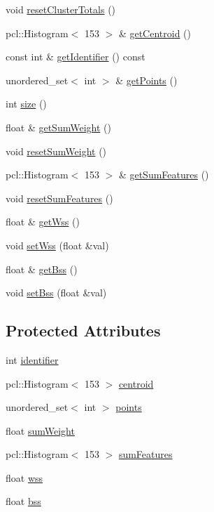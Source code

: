 \begin{DoxyCompactItemize}
void \hyperlink{class_cluster_ad164f4a4c7eb8d35b8098149d83246db}{reset\+Cluster\+Totals} ()
\item 
pcl\+::\+Histogram$<$ 153 $>$ \& \hyperlink{class_cluster_ad4e959d20fb0c9b208ee97e2082c51b1}{get\+Centroid} ()
\item 
const int \& \hyperlink{class_cluster_a78429c346e1fdfe24fbd3863a16c924f}{get\+Identifier} () const
\item 
unordered\+\_\+set$<$ int $>$ \& \hyperlink{class_cluster_a14344a9dd9efc93609344cc3fb018f37}{get\+Points} ()
\item 
int \hyperlink{class_cluster_a3de9ef447e04c6691a5010d3b0b7916b}{size} ()
\item 
float \& \hyperlink{class_cluster_ac011ee866632afed7b36759f9675f01f}{get\+Sum\+Weight} ()
\item 
void \hyperlink{class_cluster_a4cd75a1e9afb0d72b0d91c5549869ce1}{reset\+Sum\+Weight} ()
\item 
pcl\+::\+Histogram$<$ 153 $>$ \& \hyperlink{class_cluster_ab5d2cbdb6de3a6efbecaab959503714b}{get\+Sum\+Features} ()
\item 
void \hyperlink{class_cluster_a0ea9e78709352146e9a0f3bcb0574928}{reset\+Sum\+Features} ()
\item 
float \& \hyperlink{class_cluster_ab8c35f60eff5f2f4c0508900650b058c}{get\+Wss} ()
\item 
void \hyperlink{class_cluster_a400d6e1f3b7e206bec4821dcf5aef3ec}{set\+Wss} (float \&val)
\item 
float \& \hyperlink{class_cluster_acc50770cbc475efa285a2ff79b335530}{get\+Bss} ()
\item 
void \hyperlink{class_cluster_a6d4da0772bd78a707e59d90a4a026588}{set\+Bss} (float \&val)
\end{DoxyCompactItemize}
\subsection*{Protected Attributes}
\begin{DoxyCompactItemize}
\item 
int \hyperlink{class_cluster_a5b3de44acabe712cdcc405fa40f8812a}{identifier}
\item 
pcl\+::\+Histogram$<$ 153 $>$ \hyperlink{class_cluster_a06b612a067c349bd2a56d1960d229e2a}{centroid}
\item 
unordered\+\_\+set$<$ int $>$ \hyperlink{class_cluster_a9aa583a643474a3744e1508ab51807d5}{points}
\item 
float \hyperlink{class_cluster_a1380f8914d5f22ca56afe13dd323d8e5}{sum\+Weight}
\item 
pcl\+::\+Histogram$<$ 153 $>$ \hyperlink{class_cluster_a9440083a17c6144a556433afa719e8ad}{sum\+Features}
\item 
float \hyperlink{class_cluster_a3485a5dc53d0094f618b9308aea59288}{wss}
\item 
float \hyperlink{class_cluster_aa83d01b4c4d33763154c82cbfdce7fff}{bss}
\end{DoxyCompactItemize}


